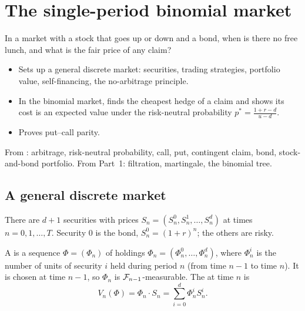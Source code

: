 \chapter{The single-period binomial market}
\label{ch:binomial-one}

\begin{question}
In a market with a stock that goes up or down and a bond, when is there no free lunch, and what is the fair price of any claim?
\end{question}

\begin{whatfor}
\begin{itemize}
  \item Sets up a general discrete market: securities, trading strategies, portfolio value, self-financing, the no-arbitrage principle.
  \item In the binomial market, finds the cheapest hedge of a claim and shows its cost is an expected value under the risk-neutral probability $p^*=\frac{1+r-d}{u-d}$.
  \item Proves put--call parity.
\end{itemize}
\end{whatfor}

\begin{prereq}
From : arbitrage, risk-neutral probability, call, put, contingent claim, bond, stock-and-bond portfolio. From Part~1: filtration, martingale, the binomial tree.
\end{prereq}

\section{A general discrete market}

\begin{setup}[Securities]
There are $d+1$ securities with prices $S_n=(S_n^0,S_n^1,\dots,S_n^d)$ at times $n=0,1,\dots,T$. Security $0$ is the bond, $S_n^0=(1+r)^n$; the others are risky.
\end{setup}

\begin{definition}
A  is a sequence $\Phi=(\Phi_n)$ of holdings $\Phi_n=(\Phi_n^0,\dots,\Phi_n^d)$, where $\Phi_n^i$ is the number of units of security $i$ held during period $n$ (from time $n-1$ to time $n$). It is chosen at time $n-1$, so $\Phi_n$ is $\mathcal F_{n-1}$-measurable. The  at time $n$ is
\[
  V_n(\Phi)=\Phi_n\cdot S_n=\sum_{i=0}^d\Phi_n^iS_n^i .
\]
\end{definition}


